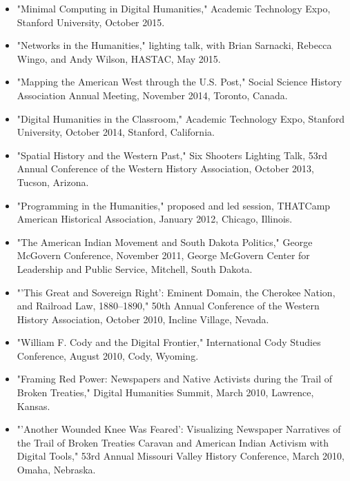 \documentclass[10pt]{article}
\begin{document}
\begin{itemize}
  \item "Minimal Computing in Digital Humanities," Academic Technology Expo, Stanford University, October 2015.
  
  \item "Networks in the Humanities," lighting talk, with Brian Sarnacki, Rebecca Wingo, and Andy Wilson, HASTAC, May 2015.
  
  \item "Mapping the American West through the U.S. Post," Social Science History Association Annual Meeting, November 2014, Toronto, Canada.
  
  \item "Digital Humanities in the Classroom," Academic Technology Expo, Stanford University, October 2014, Stanford, California.
  
  \item "Spatial History and the Western Past," Six Shooters Lighting Talk, 53rd Annual Conference of the Western History Association, October 2013, Tucson, Arizona.
  
  \item "Programming in the Humanities," proposed and led session, THATCamp American Historical Association, January 2012, Chicago, Illinois.
  
  \item "The American Indian Movement and South Dakota Politics," George McGovern Conference, November 2011, George McGovern Center for Leadership and Public Service, Mitchell, South Dakota.
  
  \item "'This Great and Sovereign Right': Eminent Domain, the Cherokee Nation, and Railroad Law, 1880--1890," 50th Annual Conference of the Western History Association, October 2010, Incline Village, Nevada.
  
  \item "William F. Cody and the Digital Frontier," International Cody Studies Conference, August 2010, Cody, Wyoming.
  
  \item "Framing Red Power: Newspapers and Native Activists during the Trail of Broken Treaties," Digital Humanities Summit, March 2010, Lawrence, Kansas.
  
  \item "'Another Wounded Knee Was Feared': Visualizing Newspaper Narratives of the Trail of Broken Treaties Caravan and American Indian Activism with Digital Tools," 53rd Annual Missouri Valley History Conference, March 2010, Omaha, Nebraska.
  

\end{itemize}
\end{document}
